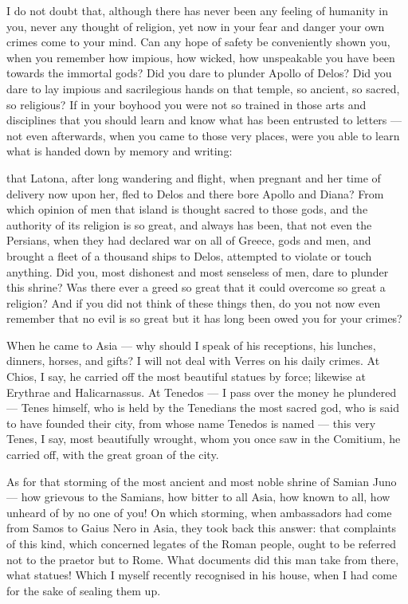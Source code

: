  I do not doubt that, although there has never been any feeling of humanity in you, never any thought of religion, yet now in your fear and danger your own crimes come to your mind. Can any hope of safety be conveniently shown you, when you remember how impious, how wicked, how unspeakable you have been towards the immortal gods? Did you dare to plunder Apollo of Delos? Did you dare to lay impious and sacrilegious hands on that temple, so ancient, so sacred, so religious? If in your boyhood you were not so trained in those arts and disciplines that you should learn and know what has been entrusted to letters --- not even afterwards, when you came to those very places, were you able to learn what is handed down by memory and writing:

 that Latona, after long wandering and flight, when pregnant and her time of delivery now upon her, fled to Delos and there bore Apollo and Diana? From which opinion of men that island is thought sacred to those gods, and the authority of its religion is so great, and always has been, that not even the Persians, when they had declared war on all of Greece, gods and men, and brought a fleet of a thousand ships to Delos, attempted to violate or touch anything. Did you, most dishonest and most senseless of men, dare to plunder this shrine? Was there ever a greed so great that it could overcome so great a religion? And if you did not think of these things then, do you not now even remember that no evil is so great but it has long been owed you for your crimes?

 When he came to Asia --- why should I speak of his receptions, his lunches, dinners, horses, and gifts? I will not deal with Verres on his daily crimes. At Chios, I say, he carried off the most beautiful statues by force; likewise at Erythrae and Halicarnassus. At Tenedos --- I pass over the money he plundered --- Tenes himself, who is held by the Tenedians the most sacred god, who is said to have founded their city, from whose name Tenedos is named --- this very Tenes, I say, most beautifully wrought, whom you once saw in the Comitium, he carried off, with the great groan of the city.

 As for that storming of the most ancient and most noble shrine of Samian Juno --- how grievous to the Samians, how bitter to all Asia, how known to all, how unheard of by no one of you! On which storming, when ambassadors had come from Samos to Gaius Nero in Asia, they took back this answer: that complaints of this kind, which concerned legates of the Roman people, ought to be referred not to the praetor but to Rome. What documents did this man take from there, what statues! Which I myself recently recognised in his house, when I had come for the sake of sealing them up.

